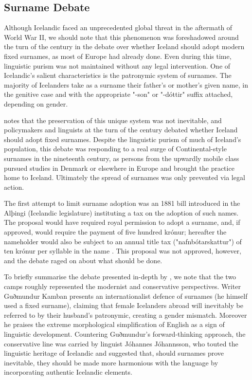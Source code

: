 \subsection{Surname Debate}

Although Icelandic faced an unprecedented global threat in the aftermath of
World War II, we should note that this phenomenon was foreshadowed around the
turn of the century in the debate over whether Iceland should adopt modern
fixed surnames, as most of Europe had already done. Even during this time,
linguistic purism was not maintained without any legal intervention. One of
Icelandic's salient characteristics is the patronymic system of surnames. The
majority of Icelanders take as a surname their father's or mother's given name,
in the genitive case and with the appropriate "-son" or "-dóttir" suffix
attached, depending on gender.

\parencite{willson02} notes that the preservation of this unique system was not
inevitable, and policymakers and linguists at the turn of the century debated
whether Iceland should adopt fixed surnames. Despite the linguistic purism of
much of Iceland's population, this debate was responding to a real surge of
Continental-style surnames in the nineteenth century, as persons from the
upwardly mobile class pursued studies in Denmark or elsewhere in Europe and
brought the practice home to Iceland. Ultimately the spread of surnames was
only prevented via legal action.

The first attempt to limit surname adoption was an 1881 bill introduced in the
Alþingi (Icelandic legislature) instituting a tax on the adoption of such
names. The proposal would have required royal permission to adopt a surname,
and, if approved, would require the payment of five hundred krónur; hereafter
the nameholder would also be subject to an annual title tax
("nafnbótarskattur") of ten krónur per syllable in the name
\parencite[137]{willson02}. This proposal was not approved, however, and the
debate raged on about what should be done.

To briefly summarise the debate presented in-depth by \textcite{willson02}, we
note that the two camps roughly represented the modernist and conservative
perspectives. Writer Guðmundur Kamban presents an internationalist defence of
surnames (he himself used a fixed surname), claiming that female Icelanders
abroad will inevitably be referred to by their husband's patronymic, creating a
gender mismatch. Moreover he praises the extreme morphological simplification
of English as a sign of linguistic development. Countering Guðmundur's
forward-thinking approach, the conservative line was carried by linguist
Jóhannes Jóhannsson, who touted the linguistic heritage of Icelandic and
suggested that, should surnames prove inevitable, they should be made more
harmonious with the language by incorporating authentic Icelandic elements.

